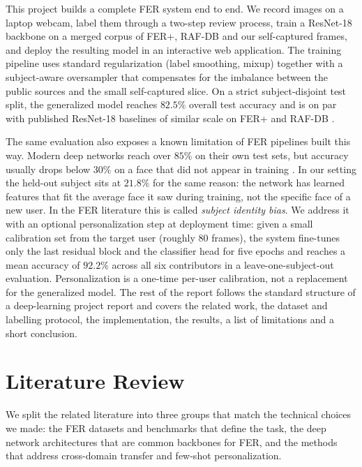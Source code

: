 \documentclass[12pt,a4paper]{article}
\begin{document}
This project builds a complete FER system end to end. We
record images on a laptop webcam, label them through a
two-step review process, train a ResNet-18 backbone on a
merged corpus of FER+, RAF-DB and our self-captured frames,
and deploy the resulting model in an interactive web
application. The training pipeline uses standard
regularization (label smoothing, mixup) together with a
subject-aware oversampler that compensates for the imbalance
between the public sources and the small self-captured slice.
On a strict subject-disjoint test split, the generalized model
reaches $82.5\%$ overall test accuracy and is on par with
published ResNet-18 baselines of similar scale on FER+ and
RAF-DB \autocite{barsoum2016ferplus, li2019rafdb}.

The same evaluation also exposes a known limitation of FER
pipelines built this way. Modern deep networks reach over
$85\%$ on their own test sets, but accuracy usually drops
below $30\%$ on a face that did not appear in training
\autocite{chen2021agra}. In our setting the held-out subject
sits at $21.8\%$ for the same reason: the network has learned
features that fit the average face it saw during training, not
the specific face of a new user. In the FER literature this is
called \emph{subject identity bias}. We address it with an
optional personalization step at deployment time: given a
small calibration set from the target user (roughly $80$
frames), the system fine-tunes only the last residual block
and the classifier head for five epochs and reaches a mean
accuracy of $92.2\%$ across all six contributors in a
leave-one-subject-out evaluation. Personalization is a
one-time per-user calibration, not a replacement for the
generalized model. The rest of the report follows the standard
structure of a deep-learning project report and covers the
related work, the dataset and labelling protocol, the
implementation, the results, a list of limitations and a
short conclusion.

\section{Literature Review}
\label{sec:litrev}

We split the related literature into three groups that match
the technical choices we made: the FER datasets and benchmarks
that define the task, the deep network architectures that are
common backbones for FER, and the methods that address
cross-domain transfer and few-shot personalization.
\end{document}
